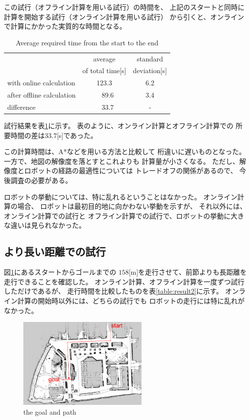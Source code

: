 \documentclass{jarticle}
\begin{document}
この試行（オフライン計算を用いる試行）の時間を、
上記のスタートと同時に計算を開始する試行（オンライン計算を用いる試行）
から引くと、オンラインで計算にかかった実質的な時間となる。

\begin{table}[hbtp]
	\caption{Average required time from the start to the end}
	\label{table:result}
	\centering
	\begin{small}
	 \begin{tabular}{l|cc}
		\hline
		 & average & standard \\
		 & of total time[s] & deviation[s] \\
		\hline \hline
		with online calculation & 123.3 & 6.2 \\
		after offline calculation &\ \ 89.6 & 3.4 \\
		\hline
		 difference & \ \ 33.7 & - \\
		\hline
	 \end{tabular}
	\end{small}
\end{table}

試行結果を表\ref{table:result}に示す。
表のように、オンライン計算とオフライン計算での
所要時間の差は$33.7$[s]であった。

この計算時間は、A*などを用いる方法と比較して
桁違いに遅いものとなった。
一方で、地図の解像度を落とすとこれよりも
計算量が小さくなる。
ただし、解像度とロボットの経路の最適性については
トレードオフの関係があるので、
今後調査の必要がある。

ロボットの挙動については、特に乱れるということはなかった。
オンライン計算の場合、
ロボットは最初目的地に向かわない挙動を示すが、
それ以外には、オンライン計算での試行と
オフライン計算での試行で、ロボットの挙動に大きな違いは見られなかった。

\subsection{より長い距離での試行}

図\ref{fig:tsudanuma-long-path}にあるスタートからゴールまでの
$158$[m]を走行させて、前節よりも長距離を走行できることを確認した。
オンライン計算、オフライン計算を一度ずつ試行しただけであるが、
走行時間を比較したものを表\ref{table:result2}に示す。
オンライン計算の開始時以外には、どちらの試行でも
ロボットの走行には特に乱れがなかった。

\begin{figure}[htb]
  \centering
   \includegraphics[height=45mm]{./figs/tsudanuma-long.png}
   \caption{the goal and path}
	\label{fig:tsudanuma-long-path}
\end{figure}
\end{document}
